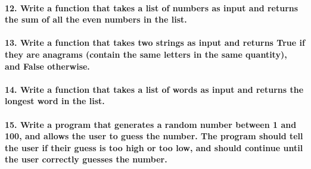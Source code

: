 \documentclass[11pt]{article}
\begin{document}
\hypertarget{write-a-function-that-takes-a-list-of-numbers-as-input-and-returns-the-sum-of-all-the-even-numbers-in-the-list.}{%
\paragraph{12. Write a function that takes a list of numbers as input
and returns the sum of all the even numbers in the
list.}\label{write-a-function-that-takes-a-list-of-numbers-as-input-and-returns-the-sum-of-all-the-even-numbers-in-the-list.}}

\hypertarget{write-a-function-that-takes-two-strings-as-input-and-returns-true-if-they-are-anagrams-contain-the-same-letters-in-the-same-quantity-and-false-otherwise.}{%
\paragraph{13. Write a function that takes two strings as input and
returns True if they are anagrams (contain the same letters in the same
quantity), and False
otherwise.}\label{write-a-function-that-takes-two-strings-as-input-and-returns-true-if-they-are-anagrams-contain-the-same-letters-in-the-same-quantity-and-false-otherwise.}}

\hypertarget{write-a-function-that-takes-a-list-of-words-as-input-and-returns-the-longest-word-in-the-list.}{%
\paragraph{14. Write a function that takes a list of words as input and
returns the longest word in the
list.}\label{write-a-function-that-takes-a-list-of-words-as-input-and-returns-the-longest-word-in-the-list.}}

\hypertarget{write-a-program-that-generates-a-random-number-between-1-and-100-and-allows-the-user-to-guess-the-number.-the-program-should-tell-the-user-if-their-guess-is-too-high-or-too-low-and-should-continue-until-the-user-correctly-guesses-the-number.}{%
\paragraph{15. Write a program that generates a random number between 1
and 100, and allows the user to guess the number. The program should
tell the user if their guess is too high or too low, and should continue
until the user correctly guesses the
number.}\label{write-a-program-that-generates-a-random-number-between-1-and-100-and-allows-the-user-to-guess-the-number.-the-program-should-tell-the-user-if-their-guess-is-too-high-or-too-low-and-should-continue-until-the-user-correctly-guesses-the-number.}}
\end{document}
